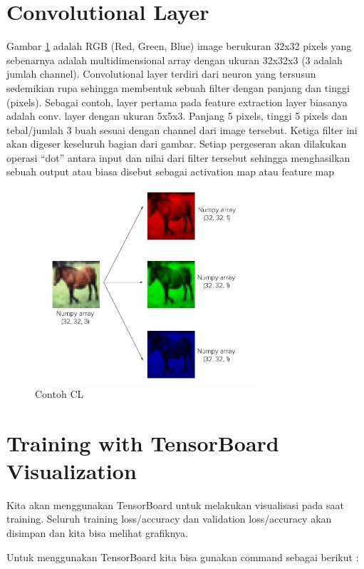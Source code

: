 \section{Convolutional Layer}
 Gambar \ref{labelgambar2} adalah RGB (Red, Green, Blue) image berukuran 32x32 pixels yang sebenarnya adalah multidimensional array dengan ukuran 32x32x3 (3 adalah jumlah channel).
Convolutional layer terdiri dari neuron yang tersusun sedemikian rupa sehingga membentuk sebuah filter dengan panjang dan tinggi (pixels). Sebagai contoh, layer pertama pada feature extraction layer biasanya adalah conv. layer dengan ukuran 5x5x3. Panjang 5 pixels, tinggi 5 pixels dan tebal/jumlah 3 buah sesuai dengan channel dari image tersebut.
Ketiga filter ini akan digeser keseluruh bagian dari gambar. Setiap pergeseran akan dilakukan operasi “dot” antara input dan nilai dari filter tersebut sehingga menghasilkan sebuah output atau biasa disebut sebagai activation map atau feature map

\begin{figure}[!htp]
	\includegraphics[width=0.75\textwidth]{figures/ConvolutionalLayer.PNG}
	\caption{Contoh CL}
	\label{labelgambar2}
\end{figure}



\section{Training with TensorBoard Visualization}
Kita akan menggunakan TensorBoard untuk melakukan visualisasi pada saat training. Seluruh training loss/accuracy dan validation loss/accuracy akan disimpan dan kita bisa melihat grafiknya.

Untuk menggunakan TensorBoard kita bisa gunakan command sebagai berikut :


